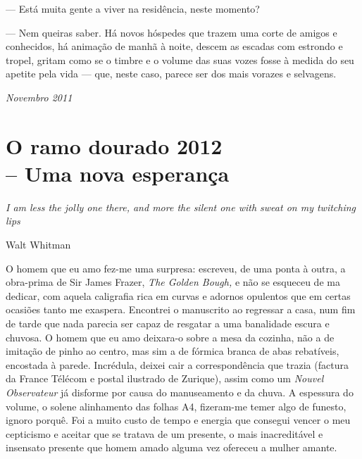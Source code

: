 --- Está muita gente a viver na residência, neste momento?

--- Nem queiras saber. Há novos hóspedes que trazem uma corte de amigos e
  conhecidos, há animação de manhã à
noite, descem as escadas com estrondo e tropel, gritam como se o timbre
e o volume das suas vozes fosse à medida do seu apetite pela vida ---
que, neste caso, parece ser dos mais vorazes e selvagens.

\begin{flushright}
\emph{Novembro 2011}
\end{flushright}

\chapter{O ramo dourado 2012\\
-- Uma nova esperança}

\epigraph{\emph{I am less the jolly one there, and more the silent one with
sweat on my twitching lips}}{Walt Whitman}

O homem que eu amo fez-me uma surpresa: escreveu, de uma ponta à outra, a
obra-prima de Sir James Frazer,
\emph{The Golden Bough, }e não se esqueceu de ma dedicar, com aquela
caligrafia rica em curvas e adornos opulentos que em certas ocasiões
tanto me exaspera. Encontrei o manuscrito ao regressar a casa, num fim
de tarde que nada parecia ser capaz de resgatar a uma banalidade escura
e chuvosa. O homem que eu amo deixara-o sobre a mesa da cozinha, não a
de imitação de pinho ao centro, mas sim a de fórmica branca de abas
rebatíveis, encostada à parede. Incrédula, deixei cair a correspondência que trazia (factura da France Télécom e postal ilustrado de
Zurique), assim como um \emph{Nouvel Observateur }já disforme por causa
do manuseamento e da chuva. A espessura do volume, o solene
alinhamento das folhas A4, fizeram-me temer algo de funesto, ignoro porquê. Foi a muito custo de tempo e
energia que consegui vencer o meu cepticismo e aceitar que se tratava de
um presente, o mais inacreditável e insensato presente que homem amado
alguma vez ofereceu a mulher amante.

